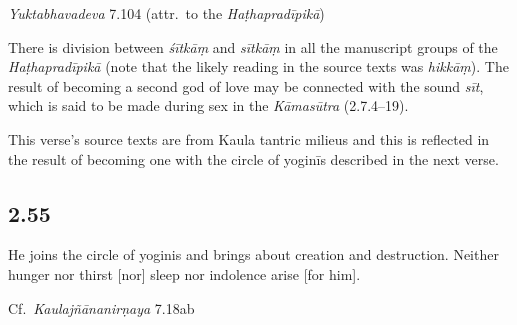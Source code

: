 \begin{ekdosis}
\begin{testimonia}[hp02_054]
\emph{Yuktabhavadeva} 7.104 (attr.~to the \emph{Haṭhapradīpikā})

\begin{versinnote} 
\end{versinnote}


\end{testimonia}

\begin{philcomm}[hp02_054]


There is division between \emph{śītkāṃ} and \emph{sītkāṃ} in all the manuscript groups of the \emph{Haṭhapradīpikā} (note that the likely reading in the source texts was \emph{hikkāṃ}). The result of becoming a second god of love may be connected with the sound \emph{sīt}, which is said to be made during sex in the \emph{Kāmasūtra} (2.7.4–19). \lb

This verse’s source texts are from Kaula tantric milieus and this is reflected in the result of becoming one with the circle of yoginīs described in the next verse.

\end{philcomm}

\subsection*{2.55}
\begin{translation}[hp02_055]
He joins the circle of yoginis and brings about creation and destruction. Neither hunger nor thirst [nor] sleep nor indolence arise [for him].
\end{translation}

\begin{sources}[hp02_055]
Cf.~\emph{Kaulajñānanirṇaya} 7.18ab

\begin{versinnote}
\end{versinnote}


\end{sources}
\end{ekdosis}
